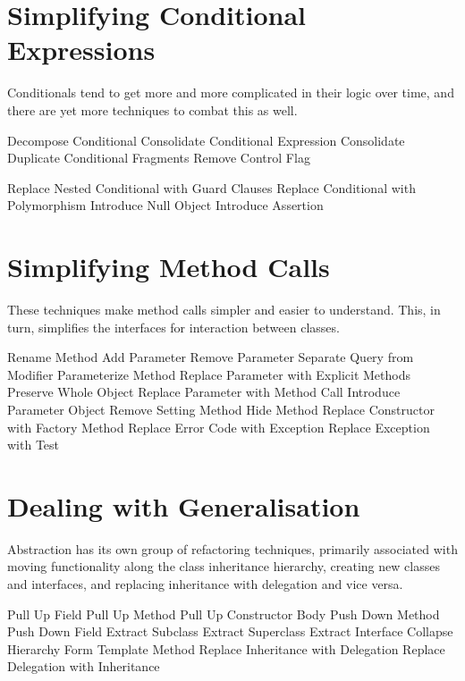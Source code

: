 \documentclass[11pt,a4paper,oneside]{book}
\begin{document}
\section{Simplifying Conditional Expressions}

Conditionals tend to get more and more complicated in their logic over time, and there are yet more techniques to combat this as well.

    Decompose Conditional
    Consolidate Conditional Expression
    Consolidate Duplicate Conditional Fragments
    Remove Control Flag

    Replace Nested Conditional with Guard Clauses
    Replace Conditional with Polymorphism
    Introduce Null Object
    Introduce Assertion




\section{Simplifying Method Calls}

These techniques make method calls simpler and easier to understand. This, in turn, simplifies the interfaces for interaction between classes.

    Rename Method
    Add Parameter
    Remove Parameter
    Separate Query from Modifier
    Parameterize Method
    Replace Parameter with Explicit Methods
    Preserve Whole Object
    Replace Parameter with Method Call
    Introduce Parameter Object
    Remove Setting Method
    Hide Method
    Replace Constructor with Factory Method
    Replace Error Code with Exception
    Replace Exception with Test




\section{Dealing with Generalisation}

Abstraction has its own group of refactoring techniques, primarily associated with moving functionality along the class inheritance hierarchy, creating new classes and interfaces, and replacing inheritance with delegation and vice versa.

    Pull Up Field
    Pull Up Method
    Pull Up Constructor Body
    Push Down Method
    Push Down Field
    Extract Subclass
    Extract Superclass
    Extract Interface
    Collapse Hierarchy
    Form Template Method
    Replace Inheritance with Delegation
    Replace Delegation with Inheritance
\end{document}
